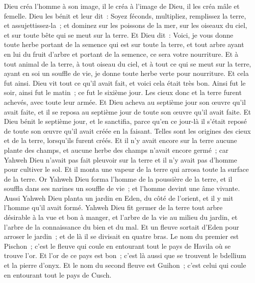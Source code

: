 \begin{multicols}{2}
Dieu créa l'homme à son image, il le créa à l'image de Dieu, il les créa mâle et femelle.
Dieu les bénit et leur dit~: Soyez féconds, multipliez, remplissez la terre, et assujettissez-la~; et dominez sur les poissons de la mer, sur les oiseaux du ciel, et sur toute bête qui se meut sur la terre.
Et Dieu dit~: Voici, je vous donne toute herbe portant de la semence qui est sur toute la terre, et tout arbre ayant en lui du fruit d'arbre et portant de la semence, ce sera votre nourriture.
Et à tout animal de la terre, à tout oiseau du ciel, et à tout ce qui se meut sur la terre, ayant en soi un souffle de vie, je donne toute herbe verte pour nourriture. Et cela fut ainsi.
Dieu vit tout ce qu'il avait fait, et voici cela était très bon. Ainsi fut le soir, ainsi fut le matin~; ce fut le sixième jour.
\VerseOne{}Les cieux donc et la terre furent achevés, avec toute leur armée.
Et Dieu acheva au septième jour son œuvre qu'il avait faite, et il se reposa au septième jour de toute son œuvre qu'il avait faite.
Et Dieu bénit le septième jour, et le sanctifia, parce qu'en ce jour-là il s'était reposé de toute son œuvre qu'il avait créée en la faisant.
Telles sont les origines des cieux et de la terre, lorsqu'ils furent créés.
Et il n'y avait encore sur la terre aucune plante des champs, et aucune herbe des champs n'avait encore germé~; car Yahweh Dieu n'avait pas fait pleuvoir sur la terre et il n'y avait pas d'homme pour cultiver le sol.
Et il monta une vapeur de la terre qui arrosa toute la surface de la terre.
Or Yahweh Dieu forma l'homme de la poussière de la terre, et il souffla dans ses narines un souffle de vie~; et l'homme devint une âme vivante.
Aussi Yahweh Dieu planta un jardin en Eden, du côté de l'orient, et il y mit l'homme qu'il avait formé.
Yahweh Dieu fit germer de la terre tout arbre désirable à la vue et bon à manger, et l'arbre de la vie au milieu du jardin, et l'arbre de la connaissance du bien et du mal.
Et un fleuve sortait d'Eden pour arroser le jardin~; et de là il se divisait en quatre bras.
Le nom du premier est Pischon~; c'est le fleuve qui coule en entourant tout le pays de Havila où se trouve l'or.
Et l'or de ce pays est bon~; c'est là aussi que se trouvent le bdellium et la pierre d'onyx.
Et le nom du second fleuve est Guihon~; c'est celui qui coule en entourant tout le pays de Cusch.

\end{multicols}
